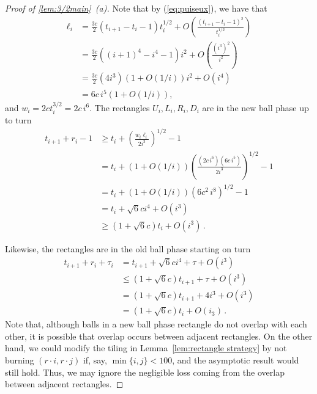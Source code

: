 \documentclass[12pt]{article}
\theoremstyle{remark}
\begin{document}
\begin{proof}[Proof of \cref{lem:3/2main}~(a)]
Note that by (\ref{eq:puiseux}), we have that
\begin{align*}
\ell_i &= \frac {3c}{2} (t_{i+1}-t_i-1)t_i^{1/2} + O \left( \frac{(t_{i+1}-t_i-1)^2}{t_i^{1/2}} \right)\\
&= \frac {3c}{2} \left( (i+1)^4-i^4-1 \right) i^2 + O \left( \frac{(i^3)^2}{i^2} \right)\\
&= \frac {3c}{2} (4 i^3) (1 + O(1/i)) i^2 + O(i^4) \\
&= 6c \, i^5 (1 + O(1/i)),
\end{align*}
and $w_i = 2ct_i^{3/2} = 2c \, i^6$. The rectangles $U_i, L_i, R_i, D_i$ are in the new ball phase up to turn
\begin{align*}
t_{i+1} + r_i - 1 
&\geq 
t_i + \left(\frac{w_i\ell_i}{2i^3}\right)^{1/2} - 1\\
&=
t_i + (1 + O(1/i)) \left(\frac{\left(2c \, i^{6}\right) \left( 6 c \, i^5 \right)}{2i^3}\right)^{1/2} - 1 \\
&=
t_i + (1 + O(1/i)) \left( 6 c^2 \, i^8 \right)^{1/2} - 1 \\
&=
t_i + \sqrt{6}c i^4 + O \left( i^3 \right)\\
&\geq 
\left(1 + \sqrt{6}c\right) t_i + O \left( i^3 \right) \,.
\end{align*}

Likewise, the rectangles are in the old ball phase starting on turn
\begin{align*}
t_{i+1} + r_i + \tau_i
&=
t_{i+1} + \sqrt{6}ci^4 + \tau + O(i^3)\\
&\leq
(1+\sqrt{6}c) t_{i+1} + \tau + O(i^3)\\
&=
(1+\sqrt{6}c) t_{i+1} + 4i^3 + O(i^3)\\
&=
(1+\sqrt{6}c) t_i + O(i_3) \,.
\end{align*}
Note that, although balls in a new ball phase rectangle do not overlap with each other, it is possible that overlap occurs between adjacent rectangles. On the other hand, we could modify the tiling in Lemma~\ref{lem:rectangle strategy} by not burning $(r \cdot i, r \cdot j)$ if, say, $\min\{i,j\} < 100$, and the asymptotic result would still hold. Thus, we may ignore the negligible loss coming from the overlap between adjacent rectangles. 


\end{proof}
\end{document}
